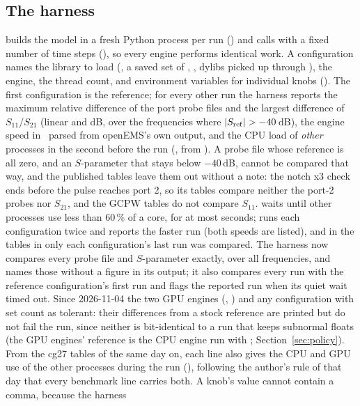 \subsection{The harness}
 builds the model in a fresh Python process per run () and calls
 with a fixed number of time steps (), so every engine performs identical work. A
configuration names the library to load (, a saved set of , ,
 dylibs picked up through ), the engine, the thread count, and environment
variables for individual knobs (). The first configuration is the reference; for every other run the
harness reports the maximum relative difference of the port probe files and the largest difference of
$S_{11}$/$S_{21}$ (linear and dB, over the frequencies where $|S_{\rm ref}|>-40$\,dB), the engine speed in \MC\ parsed
from openEMS's own output, and the CPU load of \emph{other} processes in the second before the run (,
from ). A probe file whose reference is all zero, and an $S$-parameter that stays below $-40$\,dB, cannot be
compared that way, and the published tables leave them out without a note: the notch x3 check ends before the pulse
reaches port 2, so its tables compare neither the port-2 probes nor $S_{21}$, and the GCPW tables do not compare
$S_{11}$.  waits until other processes use less than 60\,\% of a core, for at most 
seconds;  runs each configuration twice and reports the faster run (both speeds are listed), and in
the tables in  only each configuration's last run was compared. The harness now compares every probe
file and $S$-parameter exactly, over all frequencies, and names those without a figure in its output; it also compares
every run with the reference configuration's first run and flags the reported run when its quiet wait timed out.
Since 2026-11-04 the two GPU engines (, ) and any configuration with
 set count as tolerant: their differences from a stock reference are printed but do not fail the
run, since neither is bit-identical to a run that keeps subnormal floats (the GPU engines' reference is the CPU
engine run with ; Section~\ref{sec:policy}). From the cg27 tables of the same day on, each line
also gives the CPU and GPU use of the other processes during the run (), following the author's
rule of that day that every benchmark line carries both. A knob's value cannot contain a comma, because the harness
